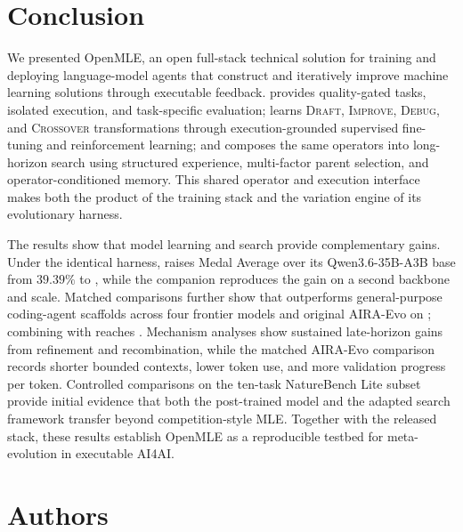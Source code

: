 \section{Conclusion}
We presented OpenMLE, an open full-stack technical solution for training and deploying language-model agents that construct and iteratively improve machine learning solutions through executable feedback. \openmlegym{} provides quality-gated tasks, isolated execution, and task-specific evaluation; \openmleerl{} learns \textsc{Draft}, \textsc{Improve}, \textsc{Debug}, and \textsc{Crossover} transformations through execution-grounded supervised fine-tuning and reinforcement learning; and \openmleevo{} composes the same operators into long-horizon search using structured experience, multi-factor parent selection, and operator-conditioned memory. This shared operator and execution interface makes \thirtyfivebmodel{} both the product of the training stack and the variation engine of its evolutionary harness.

The results show that model learning and search provide complementary gains. Under the identical \openmleevo{} harness, \thirtyfivebmodel{} raises Medal Average over its Qwen3.6-35B-A3B base from $39.39\%$ to \frontisThirtyFiveEvoResult{}, while the companion \thirtybmodel{} reproduces the gain on a second backbone and scale. Matched comparisons further show that \openmleevo{} outperforms general-purpose coding-agent scaffolds across four frontier models and original AIRA-Evo on \thirtyfivebmodel{}; combining \thirtyfivebmodel{} with \openmleevomax{} reaches \frontisThirtyFiveEvoMaxResult{}. Mechanism analyses show sustained late-horizon gains from refinement and recombination, while the matched AIRA-Evo comparison records shorter bounded contexts, lower token use, and more validation progress per token. Controlled comparisons on the ten-task NatureBench Lite subset provide initial evidence that both the post-trained model and the adapted search framework transfer beyond competition-style MLE. Together with the released stack, these results establish OpenMLE as a reproducible testbed for meta-evolution in executable AI4AI.




\section{Authors}

\begingroup
\newcommand{\affmark}[1]{\textsuperscript{#1}}
\setlength{\tabcolsep}{10pt}
\renewcommand{\arraystretch}{1.4}

